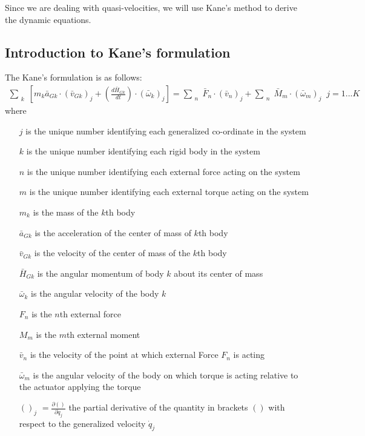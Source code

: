 \documentclass[a4paper,10pt]{article}
\begin{document}
Since we are dealing with quasi-velocities, we will use Kane's method to derive the dynamic equations. 

\subsection{Introduction to Kane's formulation}

The Kane's formulation is as follows:
\begin{align}
 \sum_{\substack{k}} \left[ m_k \bar{a}_{Gk} \cdot \left(\bar{v}_{Gk}\right)_j + \left( \frac{d\bar{H}_{Gk}}{dt} 
 \right) \cdot \left( \bar\omega_k \right)_j \right] = \sum_{\substack{n}}  \bar{F}_n \cdot \left( \bar{v}_n \right)_j 
 + \sum_{\substack{n}}  \bar{M}_m \cdot \left( \bar{\omega}_m \right)_j \;\; j=1 ... K \label{kanes}
\end{align}
where 
\begin{itemize}[label={}]
\item[$j$] is the unique number identifying each generalized co-ordinate in the system
\item[$k$] is the unique number identifying each rigid body in the system
\item[$n$] is the unique number identifying each external force acting on the system
\item[$m$] is the unique number identifying each external torque acting on the system
\item[$m_k$] is the mass of the $k$th body
\item[$\bar{a}_{Gk}$] is the acceleration of the center of mass of $k$th body
\item[$\bar{v}_{Gk}$] is the velocity of the center of mass of the $k$th body
\item[$\bar{H}_{Gk}$] is the angular momentum of body $k$ about its center of mass
\item[$\bar{\omega}_{k}$] is the angular velocity of the body $k$
\item[$F_n$] is the $n$th external force
\item[$M_m$] is the $m$th external moment
\item[$\bar{v}_{n}$] is the velocity of the point at which external Force $F_n$ is acting
\item[$\bar{\omega}_{m}$] is the angular velocity of the body on which torque is acting relative to the actuator applying the torque
\item[$()_j$] $=\frac{\partial ()}{\partial \dot{q}_j}$ the partial derivative of the quantity in brackets $()$ with respect to the generalized
velocity $\dot{q}_j$
\end{itemize}
\end{document}
